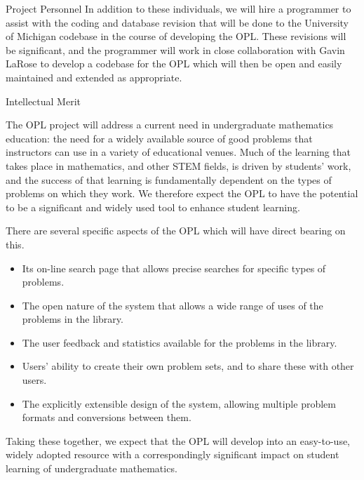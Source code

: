 \documentclass[11pt]{article}
\begin{document}
\begin{section}{Project Personnel}
In addition to these individuals, we will hire a programmer to assist with
the coding and database revision that will be done to the University of
Michigan codebase in the course of developing the OPL. These revisions
will be significant, and the programmer will work in close collaboration
with Gavin LaRose to develop a codebase for the OPL which will then be
open and easily maintained and extended as appropriate. 

\end{section}

\begin{section}{Intellectual Merit}

The OPL project will address a current need in undergraduate mathematics
education: the need for a widely available source of good problems that
instructors can use in a variety of educational venues.  Much of the
learning that takes place in mathematics, and other STEM fields, is driven
by students' work, and the success of that learning is fundamentally
dependent on the types of problems on which they work.  We therefore
expect the OPL to have the potential to be a significant and widely used
tool to enhance student learning.  

There are several specific aspects of the OPL which will have direct
bearing on this.
\begin{itemize}
  \item
    Its on-line search page that allows precise searches for specific
    types of problems.
  \item
    The open nature of the system that allows a wide range of uses of the
    problems in the library.
  \item
    The user feedback and statistics available for the problems in the
    library. 
  \item
    Users' ability to create their own problem sets, and to share
    these with other users.
  \item
    The explicitly extensible design of the system, allowing multiple
    problem formats and conversions between them.
\end{itemize}

Taking these together, we expect that the OPL will develop into an
easy-to-use, widely adopted resource with a correspondingly significant
impact on student learning of undergraduate mathematics.

\end{section}
\end{document}
